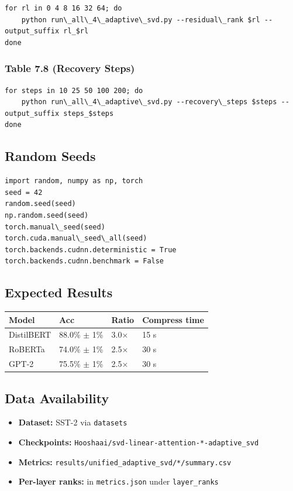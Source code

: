 \begin{lstlisting}
for rl in 0 4 8 16 32 64; do
    python run\_all\_4\_adaptive\_svd.py --residual\_rank $rl --output_suffix rl_$rl
done
\end{lstlisting}

\subsubsection{Table 7.8 (Recovery Steps)}

\begin{lstlisting}
for steps in 10 25 50 100 200; do
    python run\_all\_4\_adaptive\_svd.py --recovery\_steps $steps --output_suffix steps_$steps
done
\end{lstlisting}

\subsection{Random Seeds}

\begin{lstlisting}
import random, numpy as np, torch
seed = 42
random.seed(seed)
np.random.seed(seed)
torch.manual\_seed(seed)
torch.cuda.manual\_seed\_all(seed)
torch.backends.cudnn.deterministic = True
torch.backends.cudnn.benchmark = False
\end{lstlisting}

\subsection{Expected Results}

\begin{table}[H]
\centering
\small
\begin{tabular}{llll}
\toprule
\textbf{Model} & \textbf{Acc} & \textbf{Ratio} & \textbf{Compress time} \\
\midrule
DistilBERT & 88.0\% $\pm$ 1\% & 3.0$\times$ & 15 s \\
RoBERTa & 74.0\% $\pm$ 1\% & 2.5$\times$ & 30 s \\
GPT-2 & 75.5\% $\pm$ 1\% & 2.5$\times$ & 30 s \\
\bottomrule
\end{tabular}
\end{table}

\subsection{Data Availability}

\begin{itemize}
\item \textbf{Dataset:} SST-2 via \texttt{datasets}
\item \textbf{Checkpoints:} \texttt{Hooshaai/svd-linear-attention-*-adaptive\_svd}
\item \textbf{Metrics:} \texttt{results/unified\_adaptive\_svd/*/summary.csv}
\item \textbf{Per-layer ranks:} in \texttt{metrics.json} under \texttt{layer\_ranks}

\end{itemize}
